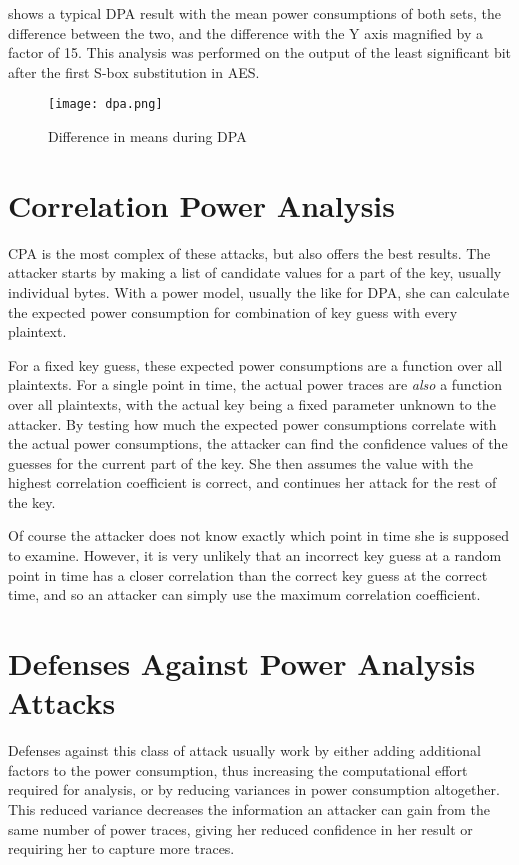  shows a typical DPA result with the mean power consumptions of both sets, the difference between the two, and the difference with the Y axis magnified by a factor of 15.
This analysis was performed on the output of the least significant bit after the first S-box substitution in AES.
\begin{figure}[h]
  \centering
  \texttt{[image: dpa.png]}
  \caption{Difference in means during DPA\cite{kocher2011introduction}}
  \label{fig:dpa}
\end{figure}

\section{Correlation Power Analysis}
CPA is the most complex of these attacks, but also offers the best results.
The attacker starts by making a list of candidate values for a part of the key, usually individual bytes.
With a power model, usually the \hammingw{} like for DPA, she can calculate the expected power consumption for combination of key guess with every plaintext.

For a fixed key guess, these expected power consumptions are a function over all plaintexts.
For a single point in time, the actual power traces are \emph{also} a function over all plaintexts, with the actual key being a fixed parameter unknown to the attacker.
By testing how much the expected power consumptions correlate with the actual power consumptions, the attacker can find the confidence values of the guesses for the current part of the key.
She then assumes the value with the highest correlation coefficient is correct, and continues her attack for the rest of the key.

Of course the attacker does not know exactly which point in time she is supposed to examine.
However, it is very unlikely that an incorrect key guess at a random point in time has a closer correlation than the correct key guess at the correct time, and so an attacker can simply use the maximum correlation coefficient.

\section{Defenses Against Power Analysis Attacks}
Defenses against this class of attack usually work by either adding additional factors to the power consumption, thus increasing the computational effort required for analysis, or by reducing variances in power consumption altogether.
This reduced variance decreases the information an attacker can gain from the same number of power traces, giving her reduced confidence in her result or requiring her to capture more traces.

